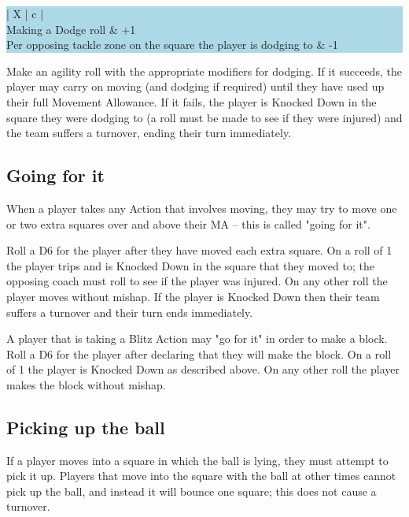 \begin{multicols}{2}
\medskip
\begingroup\setlength{\fboxsep}{0pt}\colorbox{lightBlue}{%
\begin{tabularx}{\linewidth}{ | X | c | }
\hline
{} \\
\hline
Making a Dodge roll & +1 \\
\hline
Per opposing tackle zone on the square the player is dodging to & -1 \\
\hline
\end{tabularx}%
}\endgroup
\medskip

\par Make an agility roll with the appropriate modifiers for dodging. If it succeeds, the player may carry on moving (and dodging if required) until they have used up their full Movement Allowance. If it fails, the player is Knocked Down in the square they were dodging to (a roll must be made to see if they were injured) and the team suffers a turnover, ending their turn immediately.

\subsection{Going for it}
\par When a player takes any Action that involves moving, they may try to move one or two extra squares over and above their MA -- this is called "going for it".
\par Roll a D6 for the player after they have moved each extra square. On a roll of 1 the player trips and is Knocked Down in the square that they moved to; the opposing coach must roll to see if the player was injured. On any other roll the player moves without mishap. If the player is Knocked Down then their team suffers a turnover and their turn ends immediately.
\par A player that is taking a Blitz Action may "go for it" in order to make a block. Roll a D6 for the player after declaring that they will make the block. On a roll of 1 the player is Knocked Down as described above. On any other roll the player makes the block without mishap.

\subsection{Picking up the ball}
\par If a player moves into a square in which the ball is lying, they must attempt to pick it up. Players that move into the square with the ball at other times cannot pick up the ball, and instead it will bounce one square; this does not cause a turnover.


\end{multicols}
